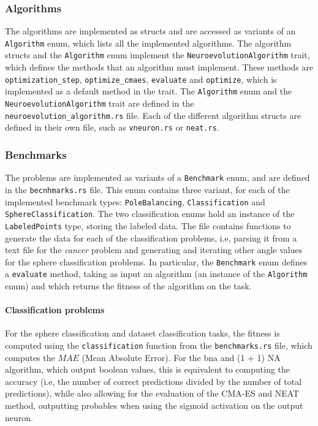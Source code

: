 \subsubsection{Algorithms}

The algorithms are implemented as structs and are accessed as variants of an \texttt{Algorithm} enum, which lists all the implemented algorithms.
The algorithm structs and the \texttt{Algorithm} enum implement the \texttt{NeuroevolutionAlgorithm} trait, which defines the methods that an algorithm must implement.
These methods are \texttt{optimization\_step}, \texttt{optimize\_cmaes}, \texttt{evaluate} and \texttt{optimize}, which is implemented as a default method in the trait.
The \texttt{Algorithm} enum and the \texttt{NeuroevolutionAlgorithm} trait are defined in the \\ \texttt{neuroevolution\_algorithm.rs} file.
Each of the different algorithm structs are defined in their own file, such as \texttt{vneuron.rs} or \texttt{neat.rs}.

\subsubsection{Benchmarks}

The problems are implemented as variants of a \texttt{Benchmark} enum, and are defined in the \texttt{becnhmarks.rs} file.
This enum contains three variant, for each of the implemented benchmark types: \texttt{PoleBalancing}, \texttt{Classification} and \texttt{SphereClassification}.
The two classification enums hold an instance of the \texttt{LabeledPoints} type, storing the labeled data. The file contains functions to generate the
data for each of the classification problems, i.e, parsing it from a text file for the \textit{cancer} problem and generating and iterating other
angle values for the sphere classification problems. In particular, the \texttt{Benchmark} enum defines a \texttt{evaluate} method, taking as input an
algorithm (an instance of the \texttt{Algorithm} enum) and which returns the fitness of the algorithm on the task.

\paragraph{Classification problems} For the sphere classification and dataset classification tasks, the fitness is computed using the \texttt{classification}
function from the \texttt{benchmarks.rs} file, which computes the $MAE$ (Mean Absolute Error). For the bna and (1 + 1) NA algorithm, which output boolean
values, this is equivalent to computing the accuracy (i.e, the number of correct predictions divided by the number of total predictions), while also
allowing for the evaluation of the CMA-ES and NEAT method, outputting probables when using the sigmoid activation on the output neuron.

